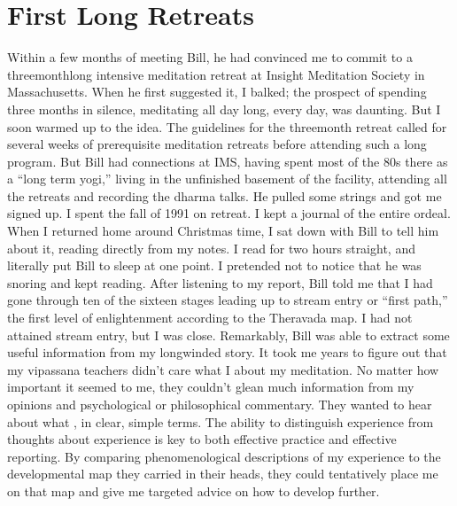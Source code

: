 \documentclass[a5paper,10pt,english]{book}
\begin{document}
\section{First Long Retreats}
\label{\detokenize{main-1:first-long-retreats}}
\sphinxAtStartPar
Within a few months of meeting Bill, he had convinced me to commit to a
three\sphinxhyphen{}month\sphinxhyphen{}long intensive meditation retreat at Insight Meditation
Society in Massachusetts. When he first suggested it, I balked; the
prospect of spending three months in silence, meditating all day long,
every day, was daunting. But I soon warmed up to the idea. The
guidelines for the three\sphinxhyphen{}month retreat called for several weeks of
prerequisite meditation retreats before attending such a long program.
But Bill had connections at IMS, having spent most of the 80s there as a
“long term yogi,” living in the unfinished basement of the facility,
attending all the retreats and recording the dharma talks. He pulled
some strings and got me signed up. I spent the fall of 1991 on retreat.
I kept a journal of the entire ordeal. When I returned home around
Christmas time, I sat down with Bill to tell him about it, reading
directly from my notes. I read for two hours straight, and literally put
Bill to sleep at one point. I pretended not to notice that he was
snoring and kept reading. After listening to my report, Bill told me
that I had gone through ten of the sixteen stages leading up to stream
entry or “first path,” the first level of enlightenment according to the
Theravada map. I had not attained stream entry, but I was close.
Remarkably, Bill was able to extract some useful information from my
long\sphinxhyphen{}winded story. It took me years to figure out that my vipassana
teachers didn’t care what I  about my meditation. No matter how
important it seemed to me, they couldn’t glean much information from my
opinions and psychological or philosophical commentary. They wanted to
hear about what , in clear, simple terms. The ability
to distinguish experience from thoughts about experience is key to both
effective practice and effective reporting. By comparing
phenomenological descriptions of my experience to the developmental map
they carried in their heads, they could tentatively place me on that map
and give me targeted advice on how to develop further.
\end{document}
